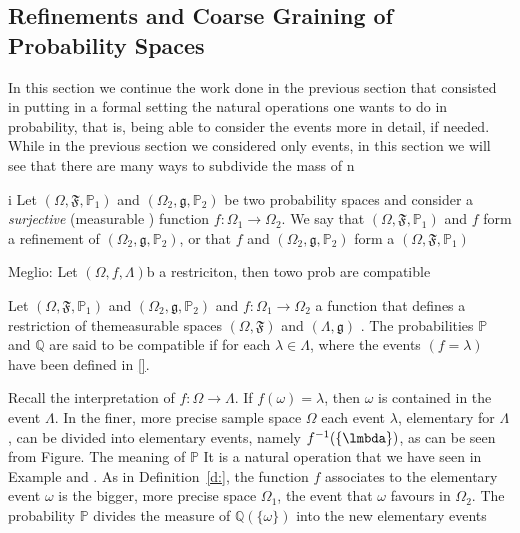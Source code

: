 \subsection{Refinements and Coarse Graining of Probability Spaces}
	In this section we continue the work done in the previous section that consisted in putting in a formal setting the natural operations one wants to do in probability, that is, being able to consider the events more in detail, if needed. While in the previous section we considered only events, in this section we will see that there are many ways to subdivide the mass of n
	\begin{definition}i
		Let $(\Omega, \mathfrak F, \mathbb P_1)$ and $(\Omega_2, \mathfrak g, \mathbb P_2 )$ be two probability spaces and consider a \emph{surjective} (measurable ) function $f: \Omega_1 \to \Omega_2$. We say that $(\Omega, \mathfrak F, \mathbb P_1)$  and $f$ form a refinement of  $(\Omega_2, \mathfrak g, \mathbb P_2 )$, or that $f$ and $(\Omega_2, \mathfrak g, \mathbb P_2 )$ form a  $(\Omega, \mathfrak F, \mathbb P_1)$ 	
	\end{definition}
	Meglio: Let $(\Omega, f , \Lambda)$b a restriciton, then towo prob are compatible 
	\begin{definition}
		\label{d:refinement_prob}
			Let $(\Omega, \mathfrak F, \mathbb P_1)$ and $(\Omega_2, \mathfrak g, \mathbb P_2 )$ and $f: \Omega_1 \to \Omega_2$ a function that defines a restriction of themeasurable spaces $(\Omega, \mathfrak F)$ and $(\Lambda, \mathfrak g)$ .  The probabilities $\mathbb P$ and $\mathbb Q$ are said to be compatible if 
	for each $\lambda \in \Lambda$, where the events $(f = \lambda )$ have been defined in \eqref{}. 
	\end{definition}
	Recall the interpretation of $f: \Omega \to \Lambda$. If $f(\omega) = \lambda$, then $\omega$ is contained in the event $\Lambda$. In the finer, more precise sample space $\Omega$ each event $\lambda$, elementary for $\Lambda$, can be divided into elementary events, namely $f^{-1}(\{\lmbda\})$, as can be seen from Figure. The meaning of $\mathbb P$ 
	It is a natural operation that we have seen in Example and . As in Definition~\ref{d:}, the function $f$ associates to the elementary event $\omega$  is the bigger, more precise space $\Omega_1$, the event that $\omega$ favours in $\Omega_2$. The probability $\mathbb P$ divides the measure of $\mathbb Q(\{\omega\})$ into the new elementary events 
